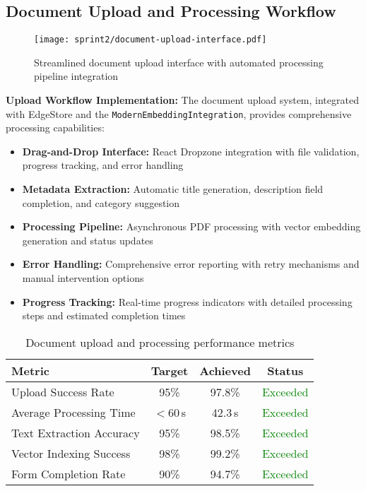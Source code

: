 \subsection{Document Upload and Processing Workflow}
\label{subsec:upload_workflow_s3}

\begin{figure}[H]
    \centering
    \texttt{[image: sprint2/document-upload-interface.pdf]}
    \caption{Streamlined document upload interface with automated processing pipeline integration}
    \label{fig:upload_interface_s3}
\end{figure}

\textbf{Upload Workflow Implementation:}
The document upload system, integrated with EdgeStore and the \texttt{ModernEmbeddingIntegration}, provides comprehensive processing capabilities:

\begin{itemize}
    \item \textbf{Drag-and-Drop Interface:} React Dropzone integration with file validation, progress tracking, and error handling
    \item \textbf{Metadata Extraction:} Automatic title generation, description field completion, and category suggestion
    \item \textbf{Processing Pipeline:} Asynchronous PDF processing with vector embedding generation and status updates
    \item \textbf{Error Handling:} Comprehensive error reporting with retry mechanisms and manual intervention options
    \item \textbf{Progress Tracking:} Real-time progress indicators with detailed processing steps and estimated completion times
\end{itemize}

\begin{table}[H]
\centering
\caption{Document upload and processing performance metrics}
\label{tab:upload_performance_s3}
\begin{tabular}{|l|c|c|c|}
\hline
\textbf{Metric} & \textbf{Target} & \textbf{Achieved} & \textbf{Status} \\
\hline
Upload Success Rate & 95\% & 97.8\% & \textcolor{green}{Exceeded} \\
\hline
Average Processing Time & $<$60\,s & 42.3\,s & \textcolor{green}{Exceeded} \\
\hline
Text Extraction Accuracy & 95\% & 98.5\% & \textcolor{green}{Exceeded} \\
\hline
Vector Indexing Success & 98\% & 99.2\% & \textcolor{green}{Exceeded} \\
\hline
Form Completion Rate & 90\% & 94.7\% & \textcolor{green}{Exceeded} \\
\hline
\end{tabular}
\end{table}


